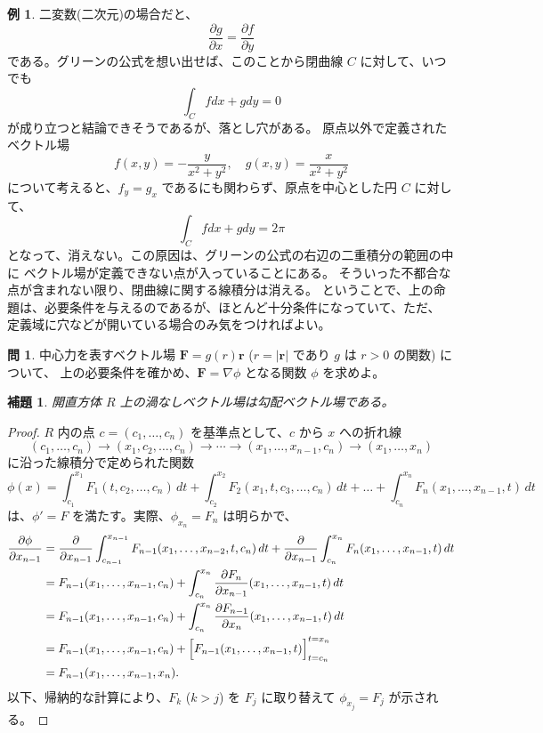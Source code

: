 \documentclass[a4paper]{jsarticle}
\newtheorem{Lemma}[Theorem]{補題}
\theoremstyle{definition}
\newtheorem{Example}[Theorem]{例}
\newtheorem{Exercise}{問}%
\theoremstyle{remark}
\begin{document}
\begin{Example}
二変数(二次元)の場合だと、
\[
\frac{\partial g}{\partial x} = \frac{\partial f}{\partial y} 
\]
である。グリーンの公式を想い出せば、このことから閉曲線 $C$ に対して、いつでも
\[
\int_C fdx + gdy = 0 
\]
が成り立つと結論できそうであるが、落とし穴がある。
原点以外で定義されたベクトル場
\[
f(x,y) = - \frac{y}{x^2+y^2}, 
\quad 
g(x,y) = \frac{x}{x^2+y^2}
\]
について考えると、$f_y = g_x$ であるにも関わらず、原点を中心とした円 $C$ に対して、
\[
\int_C fdx + gdy = 2\pi
\]
となって、消えない。この原因は、グリーンの公式の右辺の二重積分の範囲の中に
ベクトル場が定義できない点が入っていることにある。
そういった不都合な点が含まれない限り、閉曲線に関する線積分は消える。
ということで、上の命題は、必要条件を与えるのであるが、ほとんど十分条件になっていて、ただ、
定義域に穴などが開いている場合のみ気をつければよい。
\end{Example}

\begin{Exercise}
中心力を表すベクトル場
${\bm F} = g(r) {\bm r}$ ($r = | {\bm r}|$ であり $g$ は $r>0$ の関数) について、
上の必要条件を確かめ、${\bm F} = \nabla \phi$ となる関数 $\phi$ を求めよ。
\end{Exercise}


\begin{Lemma}
開直方体 $R$ 上の渦なしベクトル場は勾配ベクトル場である。
\end{Lemma}

\begin{proof}
  $R$ 内の点 $c = (c_1,\dots,c_n)$ を基準点として、$c$ から $x$ への折れ線
  \[
    (c_1,\dots,c_n) \to (x_1,c_2,\dots,c_n) \to \cdots \to (x_1,\dots,x_{n-1},c_n) \to (x_1,\dots,x_n)
  \]
  に沿った線積分で定められた関数
  \[
    \phi(x) = \int_{c_1}^{x_1} F_1(t,c_2,\dots,c_n)\, dt + \int_{c_2}^{x_2} F_2(x_1,t,c_3,\dots,c_n)\, dt
    + \dots + \int_{c_n}^{x_n} F_n(x_1,\dots,x_{n-1},t)\, dt
  \]
  は、$\phi' = F$ を満たす。実際、$\phi_{x_n} = F_n$ は明らかで、
  \begin{align*}
    \frac{\partial \phi}{\partial x_{n-1}} 
    &= \frac{\partial}{\partial x_{n-1}} \int_{c_{n-1}}^{x_{n-1}} F_{n-1}(x_1,\dots,x_{n-2},t,c_n)\, dt
      + \frac{\partial}{\partial x_{n-1}} \int_{c_n}^{x_n} F_n(x_1,\dots,x_{n-1},t)\, dt\\
    &= F_{n-1}(x_1,\dots,x_{n-1},c_n) + \int_{c_n}^{x_n} \frac{\partial F_n}{\partial x_{n-1}}(x_1,\dots,x_{n-1},t)\, dt\\
    &= F_{n-1}(x_1,\dots,x_{n-1},c_n) + \int_{c_n}^{x_n} \frac{\partial F_{n-1}}{\partial x_n}(x_1,\dots,x_{n-1},t)\, dt\\
    &= F_{n-1}(x_1,\dots,x_{n-1},c_n) + \Bigl[F_{n-1}(x_1,\dots,x_{n-1},t)\Bigr]_{t=c_n}^{t=x_n}\\
    &= F_{n-1}(x_1,\dots,x_{n-1},x_n). 
  \end{align*}
以下、帰納的な計算により、$F_k$ ($k>j$) を $F_j$ に取り替えて $\phi_{x_j} = F_j$ が示される。 
\end{proof}
\end{document}
